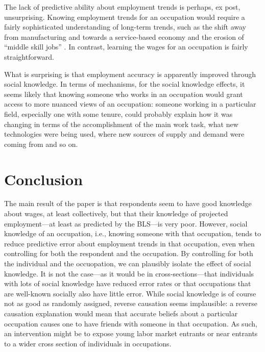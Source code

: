 \documentclass[12pt]{article}
\begin{document}
The lack of predictive ability about employment trends is perhaps, ex post, unsurprising. 
Knowing employment trends for an occupation would require a fairly sophisticated understanding of long-term trends, such as the shift away from manufacturing and towards a service-based economy and the erosion of ``middle skill jobs'' \citep{autor1998computing}.  
In contrast, learning the wages for an occupation is fairly straightforward. 

What is surprising is that employment accuracy is apparently improved through social knowledge. 
In terms of mechanisms, for the social knowledge effects, it seems likely that knowing someone who works in an occupation would grant access to more nuanced views of an occupation:
someone working in a particular field, especially one with some tenure, could probably explain how it was changing in terms of the accomplishment of the main work task, what new technologies were being used, where new sources of supply and demand were coming from and so on.  

\section{Conclusion} 

The main result of the paper is that respondents seem to have good knowledge about wages, at least collectively, but that their knowledge of projected employment---at least as predicted by the BLS---is very poor.
However, social knowledge of an occupation, i.e., knowing someone with that occupation, tends to reduce predictive error about employment trends in that occupation, even when controlling for both the respondent and the occupation. 
By controlling for both the individual and the occuopation, we can plausibly isolate the effect of social knowledge. 
It is not the case---as it would be in cross-sections---that individuals with lots of social knowledge have reduced error rates or that occupations that are well-known socially also have little error. 
While social knowledge is of course not as good as randomly assigned, reverse causation seems implausible: 
a reverse causation explanation would mean that accurate beliefs about a particular occupation causes one to have friends with someone in that occupation. 
As such, an intervention might be to expose young labor market entrants or near entrants to a wider cross section of individuals in occupations.
 



\newpage 
\end{document}
